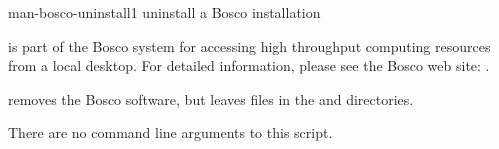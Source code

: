 \begin{ManPage}{}{man-bosco-uninstall}{1}
{uninstall a Bosco installation}


\Synopsis {}

 is part of the Bosco system for accessing high
throughput computing resources from a local desktop.
For detailed information, please see the Bosco web site:
.

 removes the Bosco software, 
but leaves files in the  and  directories.

There are no command line arguments to this script.


\end{ManPage}
